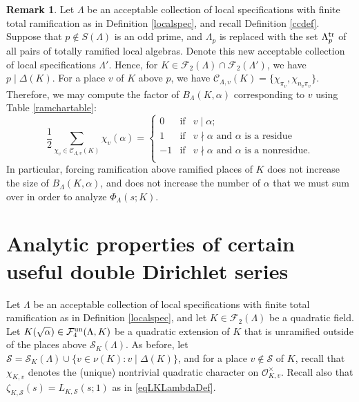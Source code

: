 \documentclass[10pt]{article}
\theoremstyle{plain}
\theoremstyle{definition}
\newtheorem{remark}[thm]{Remark}
\theoremstyle{remark}
\def\un{{\rm un}}
\def\val{{\nu}}
\def\cC{{\mathcal C}}
\def\cF{{\mathcal F}}
\def\cO{{\mathcal O}}
\def\cS{{\mathcal S}}
\begin{document}
\begin{remark}\label{remTR}  Let
$\Lambda$ be an acceptable collection of local
specifications with finite total ramification as in Definition \ref{localspec}, and recall Definition \ref{ccdef}.
Suppose that $p \notin S(\Lambda)$ is an odd prime, and $\Lambda_p$ is replaced with  the set $\Lambda_p^{\rm tr}$ of all pairs of totally ramified local algebras. Denote this new acceptable collection of local specifications $\Lambda'$. Hence, for $K \in \cF_2(\Lambda) \cap \cF_2(\Lambda')$, we have $p \mid \Delta(K)$. For  a
place $v$ of $K$ above $p$, we have
$\cC_{\Lambda,v}(K)=\{\chi_{\pi_v},\chi_{n_v\pi_v}\}$. Therefore, we
may compute the factor of $B_\Lambda(K,\alpha)$ corresponding to $v$
using Table \ref{ramchartable}:
\begin{equation*}
\frac{1}{2}\sum_{\chi_v\in \cC_{\Lambda,v}(K)}\chi_v(\alpha)=\left\{
\begin{array}{rcl}
  0 &\mbox{if}& v\mid\alpha;\\
  1 &\mbox{if}& v\nmid\alpha\mbox{ and $\alpha$ is a residue}\\
  -1 &\mbox{if}& v\nmid\alpha\mbox{ and $\alpha$ is a nonresidue}.\\
\end{array}
\right.
\end{equation*}
In particular, forcing ramification above ramified places of $K$ does
not increase the size of $B_\Lambda(K,\alpha)$, and does not increase
the number of $\alpha$ that we must sum over in order to analyze
$\Phi_\Lambda(s;K)$.
\end{remark}




\section{Analytic properties of certain useful double Dirichlet series}


Let $\Lambda$ be an acceptable collection of local 
specifications with finite total ramification as in Definition \ref{localspec}, and let $K \in
\cF_2(\Lambda)$ be a quadratic field. Let $K(\sqrt{\alpha}) \in
\cF_4^{\un}(\Lambda,K)$ be a quadratic extension of $K$ that is
unramified outside of the places above $\cS_K(\Lambda)$. As before,
let $\cS = \cS_K(\Lambda) \cup \{v \in \val(K) : v\mid\Delta(K)\}$,
and for a place $v\not\in\cS$ of $K$, recall that $\chi_{K,v}$ denotes
the (unique) nontrivial quadratic character on $\cO_{K,v}^\times$.
Recall also that $\zeta_{K,\cS}(s) = L_{K,\cS}(s;1)$ as in \eqref{eqLKLambdaDef}.
\end{document}
